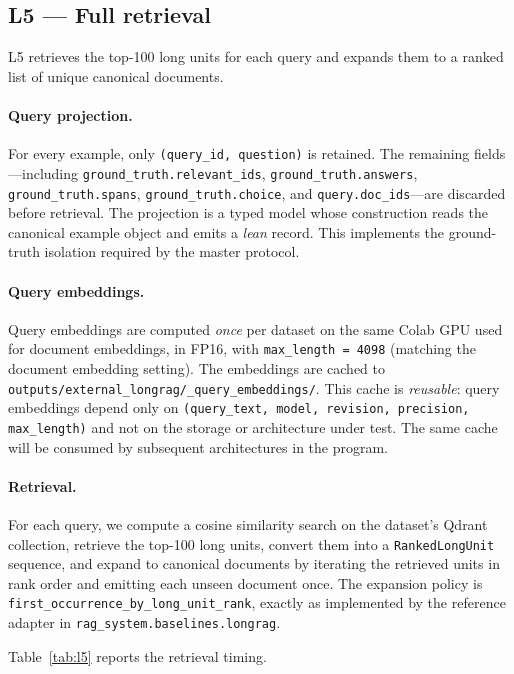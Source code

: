 \documentclass[11pt,a4paper]{article}
\begin{document}
\subsection{L5 --- Full retrieval}
L5 retrieves the top-\num{100} long units for each query and expands
them to a ranked list of unique canonical documents.

\paragraph{Query projection.}
For every example, only \texttt{(query\_id, question)} is retained.
The remaining fields---including \texttt{ground\_truth.relevant\_ids},
\texttt{ground\_truth.answers}, \texttt{ground\_truth.spans},
\texttt{ground\_truth.choice}, and \texttt{query.doc\_ids}---are
discarded before retrieval. The projection is a typed model whose
construction reads the canonical example object and emits a
\emph{lean} record. This implements the ground-truth isolation
required by the master protocol.

\paragraph{Query embeddings.}
Query embeddings are computed \emph{once} per dataset on the same
Colab GPU used for document embeddings, in FP16, with
\texttt{max\_length = 4098} (matching the document embedding
setting). The embeddings are cached to
\texttt{outputs/external\_longrag/\_query\_embeddings/}. This cache
is \emph{reusable}: query embeddings depend only on
\texttt{(query\_text, model, revision, precision, max\_length)} and
not on the storage or architecture under test. The same cache will
be consumed by subsequent architectures in the program.

\paragraph{Retrieval.}
For each query, we compute a cosine similarity search on the
dataset's Qdrant collection, retrieve the top-\num{100} long units,
convert them into a \texttt{RankedLongUnit} sequence, and expand to
canonical documents by iterating the retrieved units in rank order
and emitting each unseen document once. The expansion policy is
\texttt{first\_occurrence\_by\_long\_unit\_rank}, exactly as
implemented by the reference adapter in
\texttt{rag\_system.baselines.longrag}.

Table~\ref{tab:l5} reports the retrieval timing.
\end{document}
